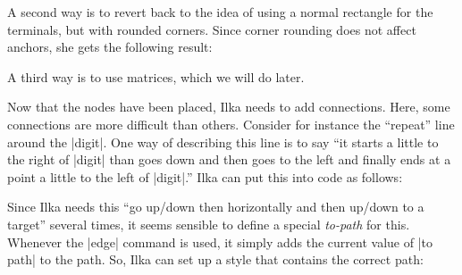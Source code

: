 A second way is to revert back to the idea of using a normal rectangle
for the terminals, but with rounded corners. Since corner rounding
does not affect anchors, she gets the following result:
\begin{codeexample}[]
\end{codeexample}
A third way is to use matrices, which we will do later.

Now that the nodes have been placed, Ilka needs to add
connections. Here, some connections are more difficult than
others. Consider for instance the ``repeat'' line around the
|digit|. One way of describing this line is to say ``it starts a
little to the right of |digit| than goes down and then goes to the
left and finally ends at a point a little to the left of |digit|.''
Ilka can put this into code as follows:
\begin{codeexample}[]
\end{codeexample}

Since Ilka needs this ``go up/down then horizontally and then up/down
to a target'' several times, it seems sensible to define a special
\emph{to-path} for this. Whenever the |edge| command is used, it
simply adds the current value of |to path| to the path. So, Ilka can
set up a style that contains the correct path:
\begin{codeexample}[]
\end{codeexample}

